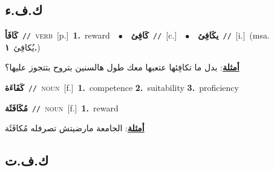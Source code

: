 \documentclass[10pt,a4paper,twoside]{article} %
\begin{document}
\begin{multicols}{2}
\vspace{-3mm}
\subsection*{\color{blue}\foreignlanguage{arabic}{ك.ف.ء}\color{blue}{}} 

{\setlength\topsep{0pt}\textbf{\foreignlanguage{arabic}{كَافَأ}}\ {\color{gray}\texttt{//}\color{black}}\ \textsc{verb}\ [p.]\ \textbf{1.}~reward\ \ $\bullet$\ \ \setlength\topsep{0pt}\textbf{\foreignlanguage{arabic}{كَافِئ}}\ {\color{gray}\texttt{//}\color{black}}\ [c.]\ \ $\bullet$\ \ \setlength\topsep{0pt}\textbf{\foreignlanguage{arabic}{يكَافِئ}}\ {\color{gray}\texttt{//}\color{black}}\ [i.]\ \color{gray}(msa. \foreignlanguage{arabic}{يُكافِئ}~\foreignlanguage{arabic}{\textbf{١.}})\color{black}\  \begin{flushright}\color{gray}\foreignlanguage{arabic}{\textbf{\underline{\foreignlanguage{arabic}{أمثلة}}}: بدل ما تكافِئها عتعبها معك طول هالسنين بتروح بتتجوز عليها؟}\end{flushright}\color{black}} \vspace{2mm}

{\setlength\topsep{0pt}\textbf{\foreignlanguage{arabic}{كَفَاءَة}}\ {\color{gray}\texttt{//}\color{black}}\ \textsc{noun}\ [f.]\ \textbf{1.}~competence  \textbf{2.}~suitability  \textbf{3.}~proficiency\ } \vspace{2mm}

{\setlength\topsep{0pt}\textbf{\foreignlanguage{arabic}{مُكَافَئَة}}\ {\color{gray}\texttt{//}\color{black}}\ \textsc{noun}\ [f.]\ \textbf{1.}~reward\  \begin{flushright}\color{gray}\foreignlanguage{arabic}{\textbf{\underline{\foreignlanguage{arabic}{أمثلة}}}: الجامعة مارضيتش تصرفله مُكافَئَة}\end{flushright}\color{black}} \vspace{2mm}

\vspace{-3mm}
\subsection*{\color{blue}\foreignlanguage{arabic}{ك.ف.ت}\color{blue}{}} 


\end{multicols}
\end{document}
